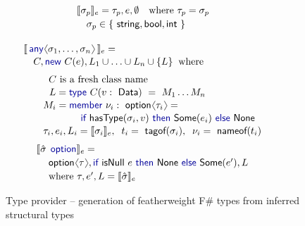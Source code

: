 \documentclass[10pt,preprint,blind,clearpagebib]{sigplanconf}
\newcommand{\langl}{\begin{picture}(4.5,7)
\put(1.1,2.5){\rotatebox{60}{\line(1,0){5.5}}}
\put(1.1,2.5){\rotatebox{300}{\line(1,0){5.5}}}
\end{picture}}
\newcommand{\rangl}{\begin{picture}(4.5,7)
\put(.9,2.5){\rotatebox{120}{\line(1,0){5.5}}}
\put(.9,2.5){\rotatebox{240}{\line(1,0){5.5}}}
\end{picture}}
\newcommand{\kvd}[1]{\textnormal{\textcolor{kvdclr}{\sffamily #1}}}
\newcommand{\ident}[1]{\textnormal{\sffamily #1}}
\newcommand{\tytagof}{\ident{tagof}}
\newcommand{\nameoftag}{\ident{nameof}}
\newcommand{\sem}[1]{\llbracket #1 \rrbracket}
\begin{document}
\begin{figure}
\begin{multicols}{2}
\noindent
\begin{equation*}
\hspace{-2.5em}
\begin{array}{l}
 \sem{\sigma_p}_e = \tau_p,e,\emptyset\quad\textnormal{where}~\tau_p = \sigma_p \\[0.2em]
\quad\sigma_p \in  \{~ \ident{string},\ident{bool},\ident{int}~\}\\[0.6em]
\end{array}
\end{equation*}
%
\begin{equation*}
\hspace{-2.5em}
\begin{array}{l}
 \sem{\,\kvd{any}\langl\sigma_1, \ldots, \sigma_n\rangl\,}_e = \\[0.1em]
 \quad C, \kvd{new}~C(e), L_1\cup\ldots\cup L_n\cup\{ L \}\;\;\textnormal{where}\\[0.6em]
 \qquad \;\;C~\textnormal{is a fresh class name} \\[0.1em]
 \qquad \;\,\,L = \kvd{type}~C(v:\ident{Data})~=~M_1\ldots M_n \\[0.1em]
 \qquad M_i = \kvd{member}~\nu_i:\ident{option}\langl\tau_i\rangl=\\[0.1em]
 \hspace{5.8em}  \kvd{if}~\ident{hasType}(\sigma_i, v)~\kvd{then}~
     \ident{Some}(e_i)~\kvd{else}~\ident{None} \\[0.1em]
 \qquad \tau_i, e_i, L_i = \sem{\sigma_i}_e,\;\; t_i = \tytagof{(\sigma_i)},\;\; \nu_i=\nameoftag{(t_i)}
\end{array}
\end{equation*}
%
\begin{equation*}
\hspace{-2.5em}
\begin{array}{l}
 \sem{\hat{\sigma}\;\,\kvd{option}}_e = \\[0.2em]
 \hspace{1.25em} \ident{option}\langl\tau\rangl, \kvd{if}~\ident{isNull}~e~\kvd{then}~\ident{None}~\kvd{else}~\ident{Some}(e'), L\\[0.2em] 
 \hspace{1.25em} \textnormal{where}~\tau, e', L = \sem{\hat{\sigma}}_e
\end{array}
\end{equation*}
\end{multicols}

\caption{Type provider -- generation of featherweight F\# types from inferred structural types}
\label{fig:tp-generation}
\vspace{-0.5em}
\end{figure}
\end{document}
